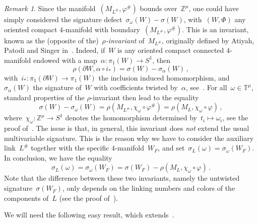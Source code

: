 \documentclass{amsart}
\newcommand{\Z}{\mathbb{Z}}
\newcommand{\T}{\mathbb{T}}
\theoremstyle{definition}
\theoremstyle{remark}
\newtheorem{rem}[thm]{Remark}
\begin{document}
	\begin{rem}
	\label{rem:rho}
	Since the manifold~$(M_{L^\#},\varphi^\#)$ bounds over~$\Z^\mu$, one could have simply considered the signature defect~$\sigma_\omega(W)-\sigma(W)$, with~$(W,\Phi)$ any oriented compact $4$-manifold with
	boundary~$(M_{L^\#},\varphi^\#)$. This is an invariant, known as the (opposite of the)~{\em$\rho$-invariant\/} of~$M_{L^\#}$, originally defined by Atiyah, Patodi and Singer in~\cite{APS75-I,APS75-II}. Indeed, if~$W$ is any
	oriented compact connected $4$-manifold endowed with a map~$\alpha\colon\pi_1(W)\to S^1$, then
	\begin{equation}
	\label{eq:rho-W}
	\rho(\partial W,\alpha\circ i_*)=\sigma(W)-\sigma_\alpha(W)\,,
	\end{equation}
	with~$i_*\colon\pi_1(\partial W)\to\pi_1(W)$ the inclusion induced homomorphism,
	and~$\sigma_\alpha(W)$ the signature of~$W$ with coefficients twisted by~$\alpha$, see~\cite[Theorem~2.4]{APS75-II}.
	For all~$\omega\in\T^\mu$, standard properties of the $\rho$-invariant then lead to the equality
	\[
	\sigma(W)-\sigma_\omega(W)=\rho(M_{L^\#},\chi_\omega\circ\varphi^\#)=\rho(M_{L},\chi_\omega\circ\varphi)\,,
	\]
	where~$\chi_\omega\colon\Z^\mu\to S^1$ denotes the homomorphism determined by~$t_i\mapsto\omega_i$,
	see the proof of~\cite[Theorem~4.4]{CMP23}.
	The issue is that, in general, this invariant does {\em not\/} extend the usual multivariable signature. This is the reason why we have to consider the auxiliary link~$L^\#$ together with the specific $4$-manifold~$W_F$, and set~$\sigma_L(\omega)=\sigma_\omega(W_F)$. In conclusion, we have the equality
	\begin{equation}
	\label{eq:rho}
	\sigma_L(\omega)=\sigma_\omega(W_F)=\sigma(W_F)-\rho(M_{L},\chi_\omega\circ\varphi)\,.
	\end{equation}
	Note that the difference between these two invariants, namely the untwisted signature~$\sigma(W_F)$, only depends on the
	linking numbers and colors of the components of~$L$ (see the proof of~\cite[Lemma~A.6]{CMP23}).
	\end{rem}
	
	We will need the following easy result, which extends~\cite[Proposition~2.10]{CF08}.
	
\end{document}
